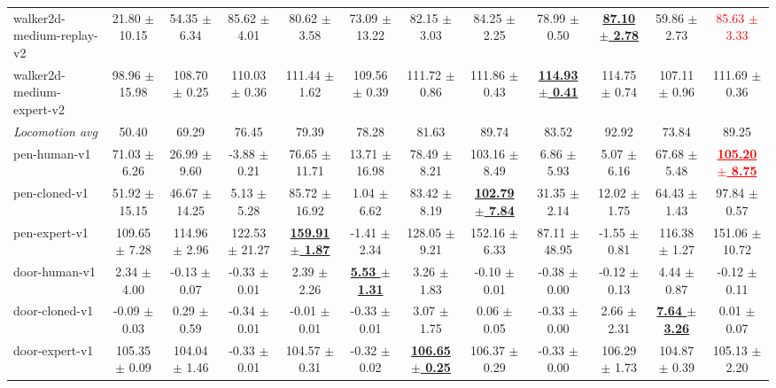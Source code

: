 \documentclass[a4paper]{article}
\begin{document}
\begin{table}[t]
{\begin{tabular}{lccccccccccc}
    walker2d-medium-replay-v2 & 21.80 $\pm$ 10.15 & 54.35 $\pm$ 6.34 & 85.62 $\pm$ 4.01 & 80.62 $\pm$ 3.58 & 73.09 $\pm$ 13.22 & 82.15 $\pm$ 3.03 & 84.25 $\pm$ 2.25 & 78.99 $\pm$ 0.50 & \textbf{\underline{87.10 $\pm$ 2.78}} & 59.86 $\pm$ 2.73 & \textcolor{red}{85.63 $\pm$ 3.33} \\
    walker2d-medium-expert-v2 & 98.96 $\pm$ 15.98 & 108.70 $\pm$ 0.25 & 110.03 $\pm$ 0.36 & 111.44 $\pm$ 1.62 & 109.56 $\pm$ 0.39 & 111.72 $\pm$ 0.86 & 111.86 $\pm$ 0.43 & \textbf{\underline{114.93 $\pm$ 0.41}} & 114.75 $\pm$ 0.74 & 107.11 $\pm$ 0.96 & 111.69 $\pm$ 0.36 \\
    \midrule
    \textit{Locomotion avg} & 50.40 & 69.29 & 76.45 & 79.39 & 78.28 & 81.63 & 89.74 & 83.52 & 92.92 & 73.84 & 89.25 \\
    \midrule
    pen-human-v1 & 71.03 $\pm$ 6.26 & 26.99 $\pm$ 9.60 & -3.88 $\pm$ 0.21 & 76.65 $\pm$ 11.71 & 13.71 $\pm$ 16.98 & 78.49 $\pm$ 8.21 & 103.16 $\pm$ 8.49 & 6.86 $\pm$ 5.93 & 5.07 $\pm$ 6.16 & 67.68 $\pm$ 5.48 & \textcolor{red}{\textbf{\underline{105.20 $\pm$ 8.75}}} \\
    pen-cloned-v1 & 51.92 $\pm$ 15.15 & 46.67 $\pm$ 14.25 & 5.13 $\pm$ 5.28 & 85.72 $\pm$ 16.92 & 1.04 $\pm$ 6.62 & 83.42 $\pm$ 8.19 & \textbf{\underline{102.79 $\pm$ 7.84}} & 31.35 $\pm$ 2.14 & 12.02 $\pm$ 1.75 & 64.43 $\pm$ 1.43 & 97.84 $\pm$ 0.57 \\
    pen-expert-v1 & 109.65 $\pm$ 7.28 & 114.96 $\pm$ 2.96 & 122.53 $\pm$ 21.27 & \textbf{\underline{159.91 $\pm$ 1.87}} & -1.41 $\pm$ 2.34 & 128.05 $\pm$ 9.21 & 152.16 $\pm$ 6.33 & 87.11 $\pm$ 48.95 & -1.55 $\pm$ 0.81 & 116.38 $\pm$ 1.27 & 151.06 $\pm$ 10.72 \\
    door-human-v1 & 2.34 $\pm$ 4.00 & -0.13 $\pm$ 0.07 & -0.33 $\pm$ 0.01 & 2.39 $\pm$ 2.26 & \textbf{\underline{5.53 $\pm$ 1.31}} & 3.26 $\pm$ 1.83 & -0.10 $\pm$ 0.01 & -0.38 $\pm$ 0.00 & -0.12 $\pm$ 0.13 & 4.44 $\pm$ 0.87 & -0.12 $\pm$ 0.11 \\
    door-cloned-v1 & -0.09 $\pm$ 0.03 & 0.29 $\pm$ 0.59 & -0.34 $\pm$ 0.01 & -0.01 $\pm$ 0.01 & -0.33 $\pm$ 0.01 & 3.07 $\pm$ 1.75 & 0.06 $\pm$ 0.05 & -0.33 $\pm$ 0.00 & 2.66 $\pm$ 2.31 & \textbf{\underline{7.64 $\pm$ 3.26}} & 0.01 $\pm$ 0.07 \\
    door-expert-v1 & 105.35 $\pm$ 0.09 & 104.04 $\pm$ 1.46 & -0.33 $\pm$ 0.01 & 104.57 $\pm$ 0.31 & -0.32 $\pm$ 0.02 & \textbf{\underline{106.65 $\pm$ 0.25}} & 106.37 $\pm$ 0.29 & -0.33 $\pm$ 0.00 & 106.29 $\pm$ 1.73 & 104.87 $\pm$ 0.39 & 105.13 $\pm$ 2.20 \\

\end{tabular}}
\end{table}
\end{document}
